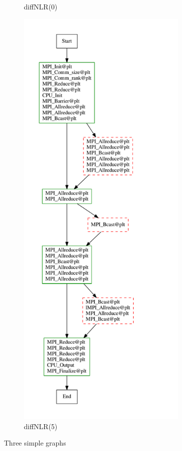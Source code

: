 \begin{figure}
\begin{subfigure}[b]{0.31\textwidth}
\caption{diffNLR(0)}
\label{diffNLR-0}
     \end{subfigure}
     \hfill
     \begin{subfigure}[b]{0.31\textwidth}
         \centering
\includegraphics[width=0.9\textwidth]{figs/diffNLR/mpiBug2-0-nn-x0.pdf}
\caption{diffNLR(5)}
\label{diffNLR-5}
     \end{subfigure}
        \caption{Three simple graphs}
        \label{fig:three graphs}
\end{figure}

